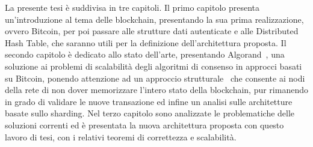 La presente tesi è suddivisa in tre capitoli. Il primo capitolo presenta un'introduzione al tema delle blockchain, presentando la sua prima realizzazione, ovvero Bitcoin, per poi passare alle strutture dati autenticate e alle Distributed Hash Table, che saranno utili per la definizione dell'architettura proposta. Il secondo capitolo è dedicato allo stato dell'arte, presentando Algorand~\cite{gilad2017algorand}, una soluzione ai problemi di scalabilità degli algoritmi di consenso in approcci basati su Bitcoin, ponendo attenzione ad un approccio strutturale~\cite{bernardini2019blockchains} che consente ai nodi della rete di non dover memorizzare l'intero stato della blockchain, pur rimanendo in grado di validare le nuove transazione ed infine un analisi sulle architetture basate sullo sharding. Nel terzo capitolo sono analizzate le problematiche delle soluzioni correnti ed è presentata la nuova architettura proposta con questo lavoro di tesi, con i relativi teoremi di correttezza e scalabilità.